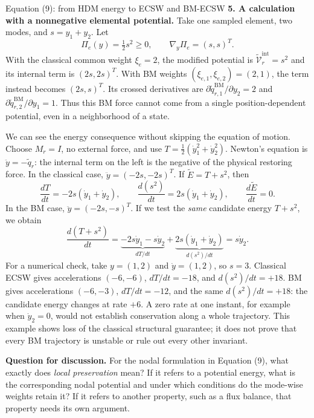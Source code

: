 \documentclass[a4paper,12pt]{article}
\begin{document}
\begin{lecturalarga}{Equation (9): from HDM energy to ECSW and BM-ECSW}
\smallskip\textbf{5. A calculation with a nonnegative elemental potential.} Take one sampled element, two modes, and $s=y_1+y_2$. Let
\[
  \Pi_e(y)=\tfrac12s^2\geq0,
  \qquad
  \nabla_y\Pi_e=(s,s)^T.
\]
With the classical common weight $\xi_e=2$, the modified potential is $\widetilde{\mathcal V}_r^{\mathrm{int}}=s^2$ and its internal term is $(2s,2s)^T$. With BM weights $(\xi_{e,1},\xi_{e,2})=(2,1)$, the term instead becomes $(2s,s)^T$. Its crossed derivatives are $\partial\widetilde q_{r,1}^{\mathrm{BM}}/\partial y_2=2$ and $\partial\widetilde q_{r,2}^{\mathrm{BM}}/\partial y_1=1$. Thus this BM force cannot come from a single position-dependent potential, even in a neighborhood of a state.

We can see the energy consequence without skipping the equation of motion. Choose $M_r=I$, no external force, and use $T=\tfrac12(\dot y_1^2+\dot y_2^2)$. Newton's equation is $\ddot y=-\widetilde q_r$: the internal term on the left is the negative of the physical restoring force. In the classical case, $\ddot y=(-2s,-2s)^T$. If $\widetilde E=T+s^2$, then
\[
  \frac{dT}{dt}=-2s(\dot y_1+\dot y_2),
  \qquad
  \frac{d(s^2)}{dt}=2s(\dot y_1+\dot y_2),
  \qquad
  \frac{d\widetilde E}{dt}=0.
\]
In the BM case, $\ddot y=(-2s,-s)^T$. If we test the \emph{same} candidate energy $T+s^2$, we obtain
\[
  \frac{d(T+s^2)}{dt}
  =\underbrace{-2s\dot y_1-s\dot y_2}_{dT/dt}
   +\underbrace{2s(\dot y_1+\dot y_2)}_{d(s^2)/dt}
  =s\dot y_2.
\]
For a numerical check, take $y=(1,2)$ and $\dot y=(1,2)$, so $s=3$. Classical ECSW gives accelerations $(-6,-6)$, $dT/dt=-18$, and $d(s^2)/dt=+18$. BM gives accelerations $(-6,-3)$, $dT/dt=-12$, and the same $d(s^2)/dt=+18$: the candidate energy changes at rate $+6$. A zero rate at one instant, for example when $\dot y_2=0$, would not establish conservation along a whole trajectory. This example shows loss of the classical structural guarantee; it does not prove that every BM trajectory is unstable or rule out every other invariant.

\smallskip\textbf{Question for discussion.} For the nodal formulation in Equation (9), what exactly does \emph{local preservation} mean? If it refers to a potential energy, what is the corresponding nodal potential and under which conditions do the mode-wise weights retain it? If it refers to another property, such as a flux balance, that property needs its own argument.
\end{lecturalarga}
\end{document}
